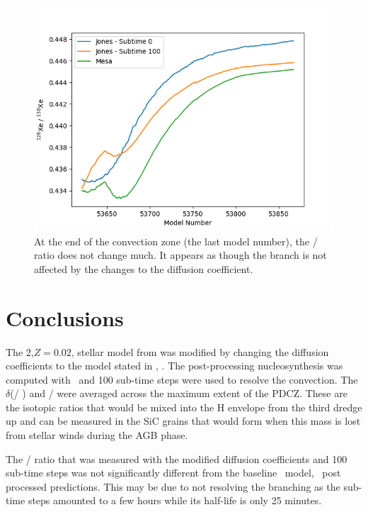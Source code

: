 \documentclass[fleqn,usenatbib]{mnras}
\begin{document}
\begin{figure}
   \includegraphics[width=1\columnwidth]{figs/JonesS1_xe2.png}
   \caption{At the end of the convection zone (the last model number), the \xenon[128] / \xenon[130] ratio does not change much. It appears as though the \iodine[128] branch is not affected by the changes to the diffusion coefficient.}
\end{figure}

\section{Conclusions}

The 2\Msun,$Z=0.02$, stellar model from \citet{models} was modified by changing the diffusion coefficients to the model stated in \citet{4pi}, . The post-processing nucleosynthesis was computed with \mppnp~and 100 sub-time steps were used to resolve the convection. The  $\delta$(\zirconium[96] / \zirconium[94]) and \xenon[128] / \xenon[130] were averaged across the maximum extent of the PDCZ. These are the isotopic ratios that would be mixed into the H envelope from the third dredge up and can be measured in the SiC grains that would form when this mass is lost from stellar winds during the AGB phase.

The \xenon[128] / \xenon[130] ratio that was measured with the modified diffusion coefficients and 100 sub-time steps was not significantly different from the baseline \MESA~model, \mppnp~post processed predictions. This may be due to not resolving the \iodine[128] branching as the sub-time steps amounted to a few hours while its half-life is only 25 minutes. 
\end{document}
